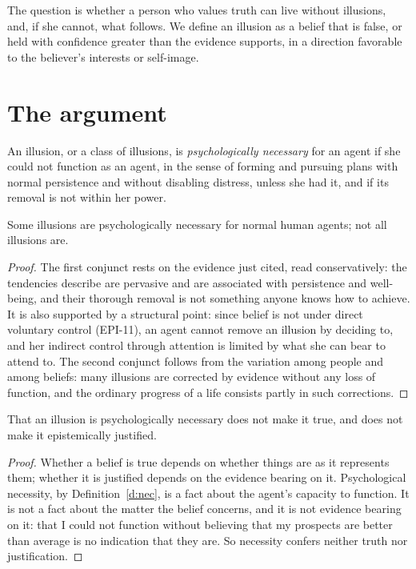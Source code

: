 \documentclass{situationist-preprint}
\begin{document}
The question is whether a person who values truth can live without illusions, and, if she cannot, what follows. We define an illusion as a belief that is false, or held with confidence greater than the evidence supports, in a direction favorable to the believer's interests or self-image.

\section{The argument}

\begin{definition}\label{d:nec}
An illusion, or a class of illusions, is \emph{psychologically necessary} for an agent if she could not function as an agent, in the sense of forming and pursuing plans with normal persistence and without disabling distress, unless she had it, and if its removal is not within her power.
\end{definition}

\begin{proposition}\label{p:partial}
Some illusions are psychologically necessary for normal human agents; not all illusions are.
\end{proposition}

\begin{proof}
The first conjunct rests on the evidence just cited, read conservatively: the tendencies \citet{Taylor1988} describe are pervasive and are associated with persistence and well-being, and their thorough removal is not something anyone knows how to achieve. It is also supported by a structural point: since belief is not under direct voluntary control (EPI-11), an agent cannot remove an illusion by deciding to, and her indirect control through attention is limited by what she can bear to attend to. The second conjunct follows from the variation among people and among beliefs: many illusions are corrected by evidence without any loss of function, and the ordinary progress of a life consists partly in such corrections.
\end{proof}

\begin{theorem}\label{t:nottrue}
That an illusion is psychologically necessary does not make it true, and does not make it epistemically justified.
\end{theorem}

\begin{proof}
Whether a belief is true depends on whether things are as it represents them; whether it is justified depends on the evidence bearing on it. Psychological necessity, by Definition~\ref{d:nec}, is a fact about the agent's capacity to function. It is not a fact about the matter the belief concerns, and it is not evidence bearing on it: that I could not function without believing that my prospects are better than average is no indication that they are. So necessity confers neither truth nor justification.
\end{proof}
\end{document}
